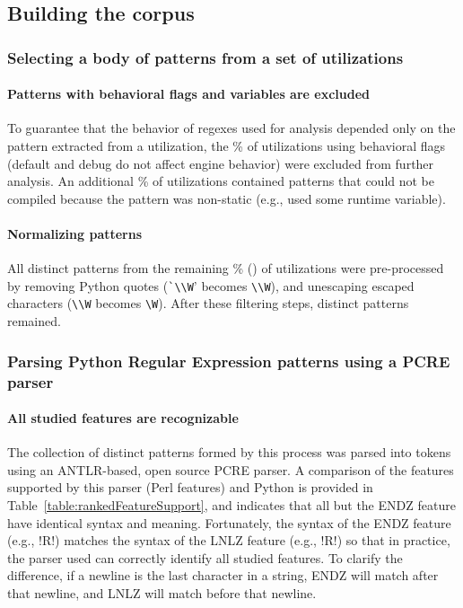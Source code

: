 \subsection{Building the corpus}
\subsubsection{Selecting a body of patterns from a set of utilizations}
\paragraph{Patterns with behavioral flags and variables are excluded} To guarantee that the behavior of regexes used for analysis depended only on the pattern extracted from a utilization, the \%  of utilizations using behavioral flags (default and debug do not affect engine behavior) were excluded from further analysis.  An additional \% of utilizations contained patterns that could not be compiled because the pattern was non-static (e.g., used some runtime variable).

\paragraph{Normalizing patterns} All distinct patterns from the remaining \% () of utilizations were pre-processed by removing Python quotes (\verb!`\\W!' becomes \verb!\\W!), and unescaping escaped characters (\verb!\\W! becomes \verb!\W!).  After these filtering steps,  distinct patterns remained.

\subsubsection{Parsing Python Regular Expression patterns using a PCRE parser}
\paragraph{All studied features are recognizable} The collection of distinct patterns formed by this process was parsed into tokens using an ANTLR-based, open source PCRE parser.  A comparison of the features supported by this parser (Perl features) and Python is provided in Table~\ref{table:rankedFeatureSupport}, and indicates that all but the ENDZ feature have identical syntax and meaning.  Fortunately, the syntax of the ENDZ feature (e.g., \cverb!R\Z!) matches the syntax of the LNLZ feature (e.g., \cverb!R\Z!) so that in practice, the parser used can correctly identify all studied features.  To clarify the difference, if a newline is the last character in a string, ENDZ will match after that newline, and LNLZ will match before that newline.

